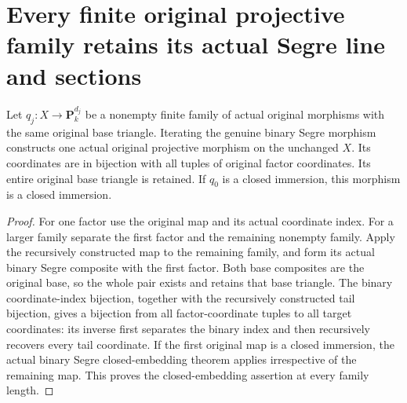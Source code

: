 \section{Every finite original projective family retains its actual Segre line and sections}
\label{sec:finite-segre-original-projective-maps}
\begin{definition}
\label{def:finite-original-segre-morphism}
\leanok
{}
Let $q_j:X\to\mathbf P_k^{d_j}$ be a nonempty finite family of actual
original morphisms with the same original base triangle. Iterating the
genuine binary Segre morphism constructs one actual original projective
morphism on the unchanged $X$. Its coordinates are in bijection with
all tuples of original factor coordinates. Its entire original base
triangle is retained. If $q_0$ is a closed immersion, this morphism is
a closed immersion.
\end{definition}
\begin{proof}
For one factor use the original map and its actual coordinate index.
For a larger family separate the first factor and the remaining nonempty
family. Apply the recursively constructed map to the remaining family,
and form its actual binary Segre composite with the first factor.
Both base composites are the original base, so the whole pair exists
and retains that base triangle. The binary coordinate-index bijection,
together with the recursively constructed tail bijection, gives a
bijection from all factor-coordinate tuples to all target coordinates:
its inverse first separates the binary index and then recursively
recovers every tail coordinate. If the first original map is a closed
immersion, the actual binary Segre closed-embedding theorem applies
irrespective of the remaining map. This proves the closed-embedding
assertion at every family length.
\end{proof}
